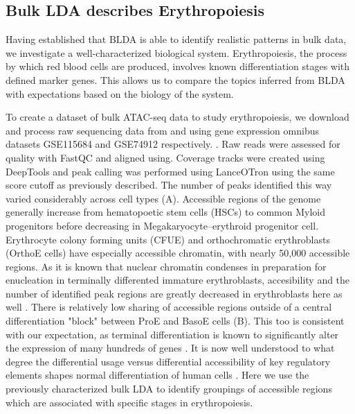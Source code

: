 \subsection{Bulk LDA describes Erythropoiesis}

Having established that BLDA is able to identify realistic patterns in bulk data, we investigate a well-characterized biological system. Erythropoiesis, the process by which red blood cells are produced, involves known differentiation stages with defined marker genes. This allows us to compare the topics inferred from BLDA with expectations based on the biology of the system.


To create a dataset of bulk ATAC-seq data to study erythropoiesis, we download and process raw sequencing data from \textcite{Ludwig2019} and \textcite{Corces2016} using gene expression omnibus datasets GSE115684 and GSE74912 respectively. . Raw reads were assessed for quality with FastQC and aligned using. Coverage tracks were created using DeepTools and peak calling was performed using LanceOTron using the same score cutoff as previously described. The number of peaks identified this way varied considerably across cell types (A). Accessible regions of the genome generally increase from hematopoetic stem cells (HSCs) to common Myloid progenitors before decreasing in Megakaryocyte–erythroid progenitor cell. Erythrocyte colony forming units (CFUE) and orthochromatic erythroblasts (OrthoE cells) have especially accessible chromatin, with nearly 50,000 accessible regions. As it is known that nuclear chromatin condenses in preparation for enucleation in terminally differented immature erythroblasts, accesibility and the number of identified peak regions are greatly decreased in erythroblasts here as well \cite{Schulz2019}. There is relatively low sharing of accessible regions outside of a central differentiation "block" between ProE and BasoE cells (B). This too is consistent with our expectation, as terminal differentiation is known to significantly alter the expression of many hundreds of genes \cite{Schulz2019}. It is now well understood to what degree the differential usage versus differential accessibility of key regulatory elements shapes normal differentiation of human cells \cite{Song2011,West2014}. Here we use the previously characterized bulk LDA to identify groupings of accessible regions which are associated with specific stages in erythropoiesis. 


